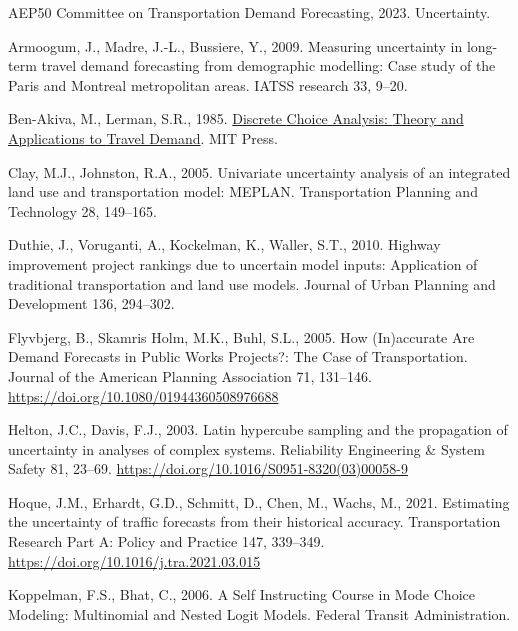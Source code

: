 \documentclass[
  futuretransp,
  submit,
  moreauthors,
]{Definitions/mdpi}
\newlength{\cslhangindent}
\newenvironment{CSLReferences}[2] %
 {\begin{list}{}{%
  \setlength{\itemindent}{0pt}
  \setlength{\leftmargin}{0pt}
  \setlength{\parsep}{0pt}
  \ifodd #1
   \setlength{\leftmargin}{\cslhangindent}
   \setlength{\itemindent}{-1\cslhangindent}
  \fi
  \setlength{\itemsep}{#2\baselineskip}}}
 {\end{list}}
\begin{document}
\label{refs}
\begin{CSLReferences}{1}{0}
AEP50 Committee on Transportation Demand Forecasting, 2023. Uncertainty.

Armoogum, J., Madre, J.-L., Bussiere, Y., 2009. Measuring uncertainty in
long-term travel demand forecasting from demographic modelling: {Case}
study of the {Paris} and {Montreal} metropolitan areas. IATSS research
33, 9--20.

Ben-Akiva, M., Lerman, S.R., 1985.
\href{https://www.jstor.org/stable/1391567}{Discrete {Choice Analysis}:
{Theory} and {Applications} to {Travel Demand}}. MIT Press.

Clay, M.J., Johnston, R.A., 2005. Univariate uncertainty analysis of an
integrated land use and transportation model: {MEPLAN}. Transportation
Planning and Technology 28, 149--165.

Duthie, J., Voruganti, A., Kockelman, K., Waller, S.T., 2010. Highway
improvement project rankings due to uncertain model inputs:
{Application} of traditional transportation and land use models. Journal
of Urban Planning and Development 136, 294--302.

Flyvbjerg, B., Skamris Holm, M.K., Buhl, S.L., 2005. How ({In})accurate
{Are Demand Forecasts} in {Public Works Projects}?: {The Case} of
{Transportation}. Journal of the American Planning Association 71,
131--146. \url{https://doi.org/10.1080/01944360508976688}

Helton, J.C., Davis, F.J., 2003. Latin hypercube sampling and the
propagation of uncertainty in analyses of complex systems. Reliability
Engineering \& System Safety 81, 23--69.
\url{https://doi.org/10.1016/S0951-8320(03)00058-9}

Hoque, J.M., Erhardt, G.D., Schmitt, D., Chen, M., Wachs, M., 2021.
Estimating the uncertainty of traffic forecasts from their historical
accuracy. Transportation Research Part A: Policy and Practice 147,
339--349. \url{https://doi.org/10.1016/j.tra.2021.03.015}

Koppelman, F.S., Bhat, C., 2006. A {Self Instructing Course} in {Mode
Choice Modeling}: {Multinomial} and {Nested Logit Models}. Federal
Transit Administration.


\end{CSLReferences}
\end{document}
